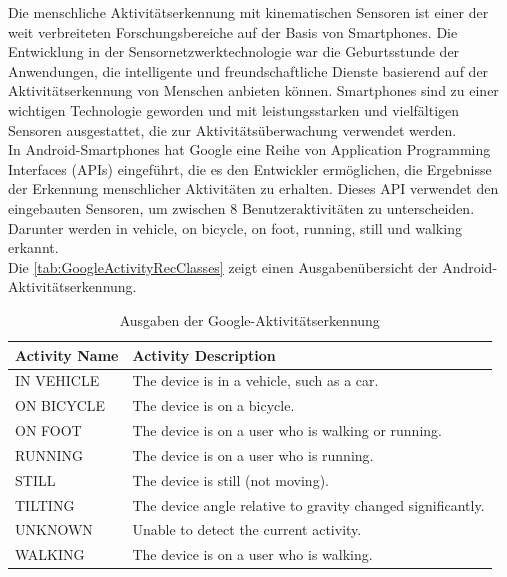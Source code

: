 Die menschliche Aktivitätserkennung mit kinematischen Sensoren ist einer der weit verbreiteten Forschungsbereiche auf der Basis von Smartphones. Die Entwicklung in der Sensornetzwerktechnologie war die Geburtsstunde der Anwendungen, die intelligente und freundschaftliche Dienste basierend auf der Aktivitätserkennung von Menschen anbieten können.
Smartphones sind zu einer wichtigen Technologie geworden und mit leistungsstarken und vielfältigen Sensoren ausgestattet, die zur Aktivitätsüberwachung verwendet werden. \citep{Rasheed2015} \\

In Android-Smartphones hat Google eine Reihe von Application Programming Interfaces (APIs) eingeführt, die es den Entwickler ermöglichen, die Ergebnisse der Erkennung menschlicher Aktivitäten zu erhalten.
Dieses API verwendet den eingebauten Sensoren, um zwischen 8 Benutzeraktivitäten zu unterscheiden. Darunter werden \glqq in vehicle\grqq{}, \glqq on bicycle\grqq{}, \glqq on foot\grqq{}, \glqq running\grqq{}, \glqq still\grqq{} und \glqq walking\grqq{} erkannt. \citep{Tran2016}\citep{Elbayoumy2018}\\

Die \autoref{tab:GoogleActivityRecClasses} zeigt einen Ausgabenübersicht der Android-Aktivitätserkennung. \\

\begin{table}\caption{Ausgaben der Google-Aktivitätserkennung\citep{Elbayoumy2018}} 
	\centering
	\begin{tabular}{|p{}|>{\arraybackslash}p{}|}
		\hline
		\textbf{Activity Name} & \textbf{Activity Description}\\
		\hline
		IN VEHICLE & The device is in a vehicle, such as a car.\\
		\hline
		ON BICYCLE & The device is on a bicycle.\\
		\hline
		ON FOOT & The device is on a user who is walking or running.\\
		\hline
		RUNNING & The device is on a user who is running.\\
		\hline
		STILL  & The device is still (not moving).\\
		\hline
		TILTING  & The device angle relative to gravity changed significantly.\\
		\hline
		UNKNOWN  & Unable to detect the current activity.\\
		\hline
		WALKING & The device is on a user who is walking.\\
		\hline
	\end{tabular}
	\label{tab:GoogleActivityRecClasses}
\end{table}

